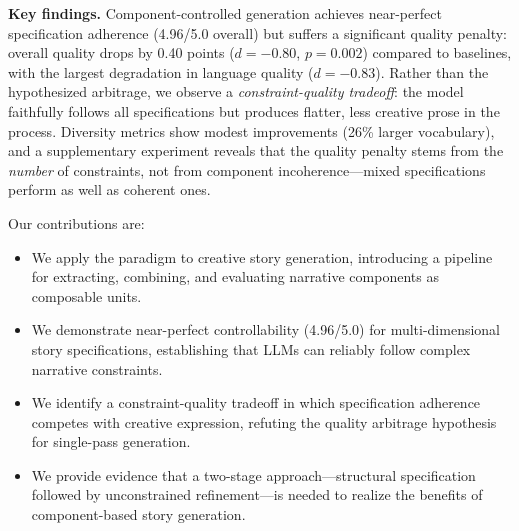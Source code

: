 {\bf Key findings.}
Component-controlled generation achieves near-perfect specification adherence (4.96/5.0 overall) but suffers a significant quality penalty: overall quality drops by 0.40 points ($d{=}{-}0.80$, $p{=}0.002$) compared to \titleonly baselines, with the largest degradation in language quality ($d{=}{-}0.83$).
Rather than the hypothesized arbitrage, we observe a \emph{constraint-quality tradeoff}: the model faithfully follows all specifications but produces flatter, less creative prose in the process.
Diversity metrics show modest improvements (26\% larger vocabulary), and a supplementary experiment reveals that the quality penalty stems from the \emph{number} of constraints, not from component incoherence---mixed specifications perform as well as coherent ones.

Our contributions are:
\begin{itemize}[leftmargin=*,itemsep=0pt,topsep=0pt]
    \item We apply the \skillmix paradigm to creative story generation, introducing a pipeline for extracting, combining, and evaluating narrative components as composable units.
    \item We demonstrate near-perfect controllability (4.96/5.0) for multi-dimensional story specifications, establishing that LLMs can reliably follow complex narrative constraints.
    \item We identify a constraint-quality tradeoff in which specification adherence competes with creative expression, refuting the quality arbitrage hypothesis for single-pass generation.
    \item We provide evidence that a two-stage approach---structural specification followed by unconstrained refinement---is needed to realize the benefits of component-based story generation.
\end{itemize}
